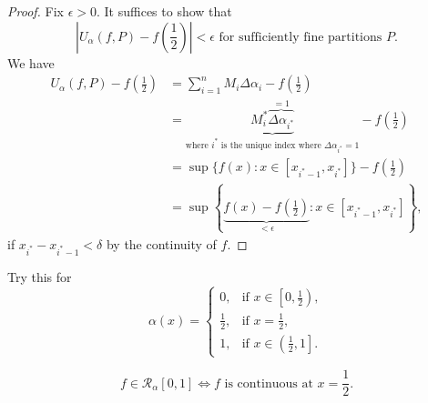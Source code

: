 \documentclass[letterpaper, reqno,11pt]{article}
\begin{document}
\begin{enumerate}
  \begin{proof}
    Fix $\epsilon > 0$. It suffices to show that
    $$ \left|U_\alpha(f, P) - f\left(\frac{1}{2}\right)\right| < \epsilon \text{ for sufficiently fine partitions $P$}. $$
    We have
    \begin{align*}
      U_\alpha(f, P) - f\left(\frac{1}{2}\right) &= \sum_{i = 1}^n M_i \Delta \alpha_i - f\left(\frac{1}{2}\right) \\
      &= \underbrace{M_i^* \overbrace{\Delta \alpha_{i^*}}^{= 1}}_\text{where $i^*$ is the unique index where $\Delta \alpha_{i^*} = 1$} - f\left(\frac{1}{2}\right) \\
      &= \sup \{ f(x) : x \in [x_{i^* - 1}, x_{i^*}] \} - f\left(\frac{1}{2}\right) \\
      &= \sup \left\{ \underbrace{f(x) - f\left(\frac{1}{2}\right)}_{< \epsilon} : x \in [x_{i^* - 1}, x_{i^*}] \right\},
    \end{align*}
    if $x_{i^*} - x_{i^* - 1} < \delta$ by the continuity of $f$.
  \end{proof}

   Try this for
  $$ \alpha(x) = \left\{
  \begin{array}{ll}
    0, & \text{if $x \in \left[0, \frac{1}{2}\right)$}, \\
      \frac{1}{2}, & \text{if $x = \frac{1}{2}$}, \\
      1, & \text{if $x \in \left(\frac{1}{2}, 1\right]$}.
  \end{array}
  \right. $$

  $$ f \in \mathcal R_\alpha[0, 1] \Leftrightarrow \text{$f$ is continuous at $x = \frac{1}{2}$}. $$
\end{enumerate}
\end{document}
